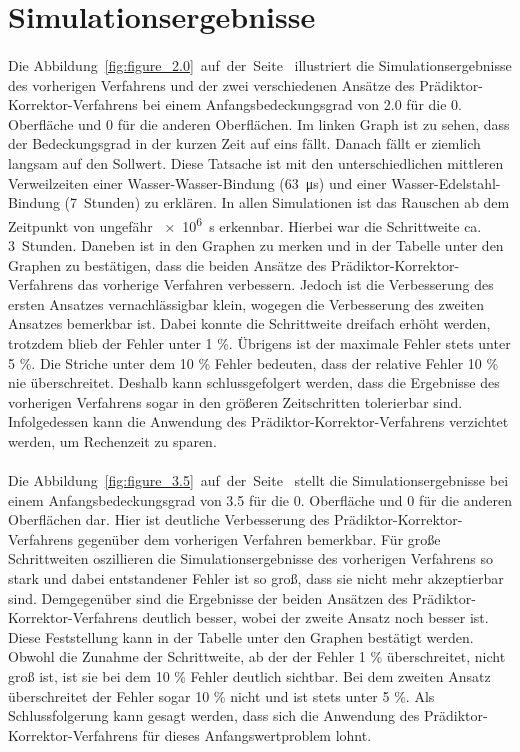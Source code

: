 \documentclass{listhesis}
\begin{document}
\section{Simulationsergebnisse} \label{section:simuergebnisse}
\paragraph{}
Die Abbildung~\ref{fig:figure_2.0}~auf~der~Seite~\pageref{fig:figure_2.0} illustriert die Simulationsergebnisse des vorherigen Verfahrens und der zwei verschiedenen Ansätze des Prädiktor-Korrektor-Verfahrens bei einem Anfangsbedeckungsgrad von 2.0 für die 0. Oberfläche und 0 für die anderen Oberflächen. Im linken Graph ist zu sehen, dass der Bedeckungsgrad in der kurzen Zeit auf eins fällt. Danach fällt er ziemlich langsam auf den Sollwert. Diese Tatsache ist mit den unterschiedlichen mittleren Verweilzeiten einer Wasser-Wasser-Bindung (\SI{63}{\micro\s}) und einer Wasser-Edelstahl-Bindung (\SI{7}{Stunden}) zu erklären. In allen Simulationen ist das Rauschen ab dem Zeitpunkt von ungefähr \SI{e6}{\s} erkennbar. Hierbei war die Schrittweite ca. \SI{3}{Stunden}. Daneben ist in den Graphen zu merken und in der Tabelle unter den Graphen zu bestätigen, dass die beiden Ansätze des Prädiktor-Korrektor-Verfahrens das vorherige Verfahren verbessern. Jedoch ist die Verbesserung des ersten Ansatzes vernachlässigbar klein, wogegen die Verbesserung des zweiten Ansatzes bemerkbar ist. Dabei konnte die Schrittweite dreifach erhöht werden, trotzdem blieb der Fehler unter 1 \%. Übrigens ist der maximale Fehler stets unter 5 \%. Die Striche unter dem 10 \% Fehler bedeuten, dass der relative Fehler 10 \% nie überschreitet. Deshalb kann schlussgefolgert werden, dass die Ergebnisse des vorherigen Verfahrens sogar in den größeren Zeitschritten tolerierbar sind. Infolgedessen kann die Anwendung des Prädiktor-Korrektor-Verfahrens verzichtet werden, um Rechenzeit zu sparen.

\paragraph{}
Die Abbildung~\ref{fig:figure_3.5}~auf~der~Seite~\pageref{fig:figure_3.5} stellt die Simulationsergebnisse bei einem Anfangsbedeckungsgrad von 3.5 für die 0. Oberfläche und 0 für die anderen Oberflächen dar. Hier ist deutliche Verbesserung des Prädiktor-Korrektor-Verfahrens gegenüber dem vorherigen Verfahren bemerkbar. Für große Schrittweiten oszillieren die Simulationsergebnisse des vorherigen Verfahrens so stark und dabei entstandener Fehler ist so groß, dass sie nicht mehr akzeptierbar sind. Demgegenüber sind die Ergebnisse der beiden Ansätzen des Prädiktor-Korrektor-Verfahrens deutlich besser, wobei der zweite Ansatz noch besser ist. Diese Feststellung kann in der Tabelle unter den Graphen bestätigt werden. Obwohl die Zunahme der Schrittweite, ab der der Fehler 1 \% überschreitet, nicht groß ist, ist sie bei dem 10 \% Fehler deutlich sichtbar. Bei dem zweiten Ansatz überschreitet der Fehler sogar 10 \% nicht und ist stets unter 5 \%. Als Schlussfolgerung kann gesagt werden, dass sich die Anwendung des Prädiktor-Korrektor-Verfahrens für dieses Anfangswertproblem lohnt.
\end{document}
